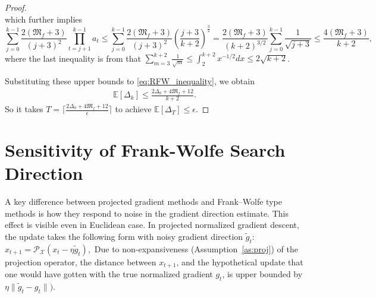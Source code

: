 \documentclass{article}
\theoremstyle{plain}
\theoremstyle{definition}
\theoremstyle{remark}
\begin{document}
\begin{proof}
\begin{equation*}
\end{equation*}
which further implies 
\begin{equation*}%
\sum_{j=0}^{k-1} \frac{2(\mathfrak{M}_f+3)}{(j+3)^2}\prod_{t=j+1}^{k-1} a_t\leq 
\sum_{j=0}^{k-1} 
   \frac{2(\mathfrak{M}_f+3)}{(j+3)^2} 
   \left(\frac{j+3}{k+2}\right)^{\tfrac{3}{2}}= \frac{2(\mathfrak{M}_f+3)}{(k+2)^{3/2}} 
   \sum_{j=0}^{k-1} \frac{1}{\sqrt{j+3}} \leq \frac{4(\mathfrak{M}_f+3)}{k+2},
\end{equation*}
where the last inequality is from that $\sum_{m=3}^{k+2} \frac{1}{\sqrt{m}}
\leq \int_{2}^{k+2} x^{-1/2} dx \leq 2\sqrt{k+2}$.

Substituting these upper bounds to \eqref{eq:RFW_inequality}, we obtain
\begin{equation*}
\begin{aligned}
\mathbb{E}[\Delta_{k}]
\leq
\frac{2\Delta_{0} + 4\mathfrak{M}_f+12}{k+2}.  
\end{aligned}
\end{equation*}
So it takes $T=\lceil \frac{2\Delta_{0} + 4\mathfrak{M}_f+12}{\epsilon}\rceil$ to achieve
$\mathbb{E}[\Delta_{T}]\leq\epsilon$.
\end{proof}

\section{Sensitivity of Frank-Wolfe Search Direction}\label{sec:fw_sensitivity_example}
A key difference between projected gradient methods and Frank--Wolfe type methods is how they respond to noise in the gradient direction estimate. This effect is visible even in Euclidean case. In projected normalized gradient descent, the update takes the following form with noisy gradient direction $\tilde g_t$:
\(
     x_{t+1} = \mathcal{P}_{\mathcal{X}}(x_t - \eta \tilde g_t),
\)
Due to non-expansiveness (Assumption~\ref{as:proj}) of the projection operator, the distance between $x_{t+1}$, and the hypothetical update that one would have gotten with the true normalized gradient $g_t$, is upper bounded by $\eta\|\tilde g_t - g_t\|)$.
\end{document}

